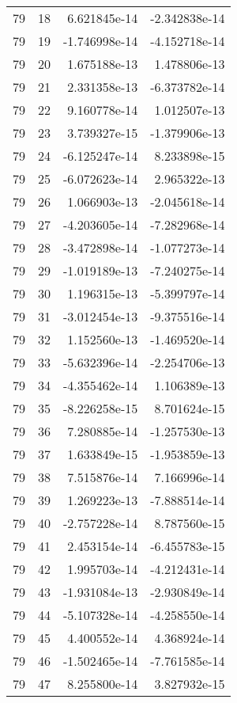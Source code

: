\begin{tabular}{rrrr}
  79 &   18 &  6.621845e-14 & -2.342838e-14 \\
  79 &   19 & -1.746998e-14 & -4.152718e-14 \\
  79 &   20 &  1.675188e-13 &  1.478806e-13 \\
  79 &   21 &  2.331358e-13 & -6.373782e-14 \\
  79 &   22 &  9.160778e-14 &  1.012507e-13 \\
  79 &   23 &  3.739327e-15 & -1.379906e-13 \\
  79 &   24 & -6.125247e-14 &  8.233898e-15 \\
  79 &   25 & -6.072623e-14 &  2.965322e-13 \\
  79 &   26 &  1.066903e-13 & -2.045618e-14 \\
  79 &   27 & -4.203605e-14 & -7.282968e-14 \\
  79 &   28 & -3.472898e-14 & -1.077273e-14 \\
  79 &   29 & -1.019189e-13 & -7.240275e-14 \\
  79 &   30 &  1.196315e-13 & -5.399797e-14 \\
  79 &   31 & -3.012454e-13 & -9.375516e-14 \\
  79 &   32 &  1.152560e-13 & -1.469520e-14 \\
  79 &   33 & -5.632396e-14 & -2.254706e-13 \\
  79 &   34 & -4.355462e-14 &  1.106389e-13 \\
  79 &   35 & -8.226258e-15 &  8.701624e-15 \\
  79 &   36 &  7.280885e-14 & -1.257530e-13 \\
  79 &   37 &  1.633849e-15 & -1.953859e-13 \\
  79 &   38 &  7.515876e-14 &  7.166996e-14 \\
  79 &   39 &  1.269223e-13 & -7.888514e-14 \\
  79 &   40 & -2.757228e-14 &  8.787560e-15 \\
  79 &   41 &  2.453154e-14 & -6.455783e-15 \\
  79 &   42 &  1.995703e-14 & -4.212431e-14 \\
  79 &   43 & -1.931084e-13 & -2.930849e-14 \\
  79 &   44 & -5.107328e-14 & -4.258550e-14 \\
  79 &   45 &  4.400552e-14 &  4.368924e-14 \\
  79 &   46 & -1.502465e-14 & -7.761585e-14 \\
  79 &   47 &  8.255800e-14 &  3.827932e-15 \\

\end{tabular}
